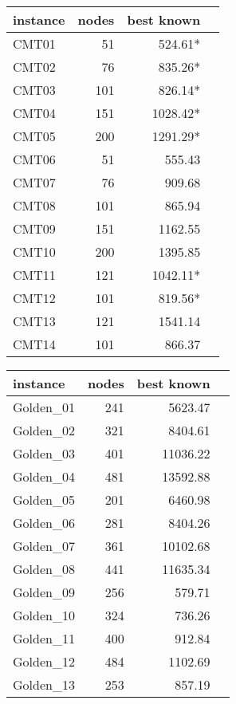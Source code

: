 \begin{table}[t]
\centering 
\begin{minipage}{0.48\textwidth}
\begin{tabular}{lrrr}
instance & nodes &best known \\
\toprule
CMT01	& 51 &524.61*  \\
CMT02	& 76 &835.26*  \\
CMT03	& 101&826.14*  \\
CMT04	& 151&1028.42* \\
CMT05	& 200&1291.29* \\
CMT06	& 51 &555.43	  \\
CMT07	& 76 &909.68	  \\
CMT08	& 101&865.94	  \\
CMT09	& 151&1162.55  \\      
CMT10	& 200&1395.85  \\      
CMT11	& 121&1042.11* \\
CMT12	& 101&819.56*  \\      
CMT13	& 121&1541.14  \\      
CMT14	& 101&866.37	  \\
\bottomrule
\end{tabular}
\end{minipage}
%
\begin{minipage}{0.48\textwidth}
\begin{tabular}{lrrr}
instance & nodes &best known \\
\toprule
Golden\_01 & 241 &	5623.47	\\
Golden\_02 & 321 &	8404.61	\\
Golden\_03 & 401 &	11036.22\\
Golden\_04 & 481 &	13592.88\\
Golden\_05 & 201 &	6460.98	\\
Golden\_06 & 281 &	8404.26	\\
Golden\_07 & 361 &	10102.68\\
Golden\_08 & 441 &	11635.34\\
Golden\_09 & 256 &	579.71	\\
Golden\_10 & 324 &	736.26	\\
Golden\_11 & 400 &	912.84	\\
Golden\_12 & 484 &	1102.69	\\
Golden\_13 & 253 &	857.19	\\

\end{tabular}
\end{minipage}
\end{table}
